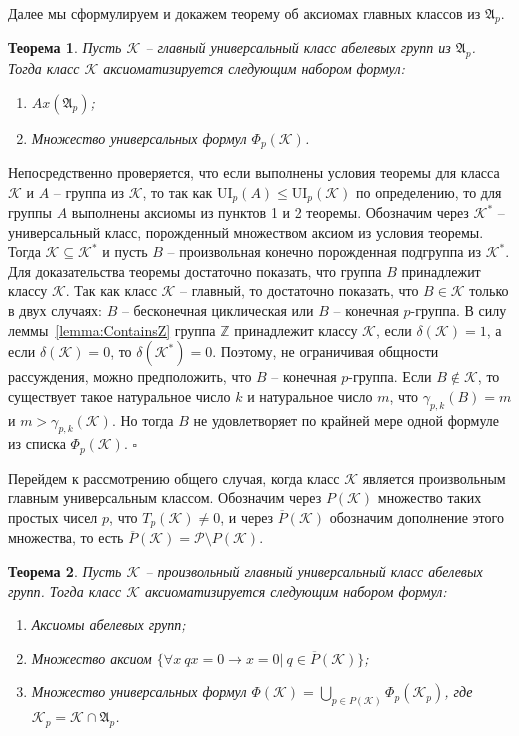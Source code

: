 \documentclass[a4paper,11pt,twoside]{article}
\newtheorem{theorem}{Теорема}[section]
\def\proof{{\noindent{\bf Доказательство.}} }
\def\A{{\mathfrak{A}}}
\def\K{{\mathcal{K}}}
\def\P{{\mathcal{P}}}
\def\Z{{\mathbb{Z}}}
\def\ui{{\mathrm{UI}}}
\begin{document}
Далее мы сформулируем и докажем теорему об аксиомах главных классов из $\A_p$.

\begin{theorem}\label{th:AxiomsOfKAp}
Пусть $\K$ -- главный универсальный класс абелевых групп из $\A_p$. Тогда класс $\K$ аксиоматизируется следующим набором формул:
\begin{enumerate}
\item $Ax(\A_p)$;
\item Множество универсальных формул $\Phi_p(\K)$.
\end{enumerate}
\end{theorem}

\proof Непосредственно проверяется, что если выполнены условия теоремы для класса $\K$ и $A$ -- группа из $\K$, то так как $\ui_p(A) \leq \ui_p(\K)$ по определению, то для группы $A$ выполнены аксиомы из пунктов 1 и 2 теоремы. Обозначим через $\K^*$ -- универсальный класс, порожденный множеством аксиом из условия теоремы. Тогда $\K \subseteq \K^*$ и пусть $B$ -- произвольная конечно порожденная подгруппа из $\K^*$. Для доказательства теоремы достаточно показать, что группа $B$ принадлежит классу $\K$. Так как класс $\K$ -- главный, то достаточно показать, что $B \in \K$ только в двух случаях: $B$ -- бесконечная циклическая или $B$ -- конечная $p$-группа. В силу леммы~\ref{lemma:ContainsZ} группа $\Z$ принадлежит классу $\K$, если $\delta(\K) = 1$, а если $\delta(\K) = 0$, то $\delta(\K^*) = 0$. Поэтому, не ограничивая общности рассуждения, можно предположить, что $B$ -- конечная $p$-группа. Если $B \notin \K$, то существует такое натуральное число $k$ и натуральное число $m$, что $\gamma_{p,k}(B) = m$ и $m > \gamma_{p,k}(\K)$. Но тогда $B$ не удовлетворяет по крайней мере одной формуле из списка $\Phi_p(\K)$. $\square$ 

Перейдем к рассмотрению общего случая, когда класс $\K$ является произвольным главным универсальным классом. Обозначим через $P(\K)$ множество таких простых чисел $p$, что $T_p(\K) \neq 0$, и через $\overline{P}(\K)$ обозначим дополнение этого множества, то есть $\overline{P}(\K) = \P \setminus P(\K).$

\begin{theorem}\label{th:AxiomsOfK}
Пусть $\K$ -- произвольный главный универсальный класс абелевых групп. Тогда класс $\K$ аксиоматизируется следующим набором формул:
\begin{enumerate}
\item Аксиомы абелевых групп;
\item Множество аксиом $\{ \forall x \ qx = 0 \rightarrow x = 0 | \ q \in \overline{P}(\K) \}$;
\item Множество универсальных формул $\Phi(\K) = \bigcup\limits_{p \in P(\K)} \Phi_p(\K_p)$, где $\K_p = \K \cap \A_p$.
\end{enumerate}
\end{theorem}
\end{document}
